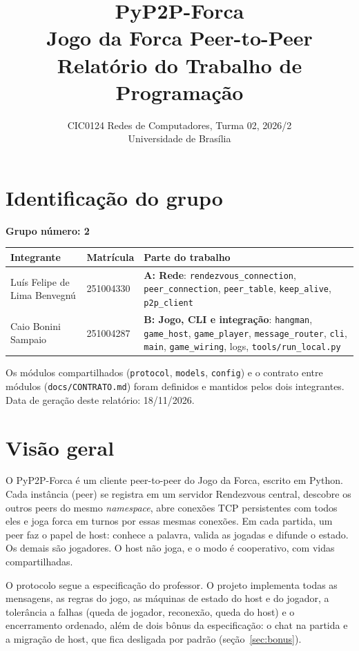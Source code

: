 \documentclass[11pt,a4paper]{article}
\title{PyP2P-Forca\\[4pt]\large Jogo da Forca Peer-to-Peer\\Relatório do Trabalho de Programação}
\author{CIC0124 Redes de Computadores, Turma 02, 2026/2\\Universidade de Brasília}
\date{}
\begin{document}
\maketitle
\vspace{-1.5em}

\section{Identificação do grupo}
\textbf{Grupo número: 2}

\begin{tabularx}{\textwidth}{@{}P{4.2cm}P{2cm}Y@{}}
\toprule
\textbf{Integrante} & \textbf{Matrícula} & \textbf{Parte do trabalho}\\
\midrule
Luís Felipe de Lima Benvegnú & 251004330 & \textbf{A: Rede}: \texttt{rendezvous\_connection}, \texttt{peer\_connection}, \texttt{peer\_table}, \texttt{keep\_alive}, \texttt{p2p\_client}\\
Caio Bonini Sampaio & 251004287 & \textbf{B: Jogo, CLI e integração}: \texttt{hangman}, \texttt{game\_host}, \texttt{game\_player}, \texttt{message\_router}, \texttt{cli}, \texttt{main}, \texttt{game\_wiring}, logs, \texttt{tools/run\_local.py}\\
\bottomrule
\end{tabularx}

{\small Os módulos compartilhados (\texttt{protocol}, \texttt{models}, \texttt{config}) e o contrato entre módulos (\texttt{docs/CONTRATO.md}) foram definidos e mantidos pelos dois integrantes. Data de geração deste relatório: 18/11/2026.}

\section{Visão geral}
O PyP2P-Forca é um cliente peer-to-peer do Jogo da Forca, escrito em Python. Cada instância (peer) se registra em um servidor Rendezvous central, descobre os outros peers do mesmo \emph{namespace}, abre conexões TCP persistentes com todos eles e joga forca em turnos por essas mesmas conexões. Em cada partida, um peer faz o papel de host: conhece a palavra, valida as jogadas e difunde o estado. Os demais são jogadores. O host não joga, e o modo é cooperativo, com vidas compartilhadas.

O protocolo segue a especificação do professor. O projeto implementa todas as mensagens, as regras do jogo, as máquinas de estado do host e do jogador, a tolerância a falhas (queda de jogador, reconexão, queda do host) e o encerramento ordenado, além de dois bônus da especificação: o chat na partida e a migração de host, que fica desligada por padrão (seção~\ref{sec:bonus}).
\end{document}

